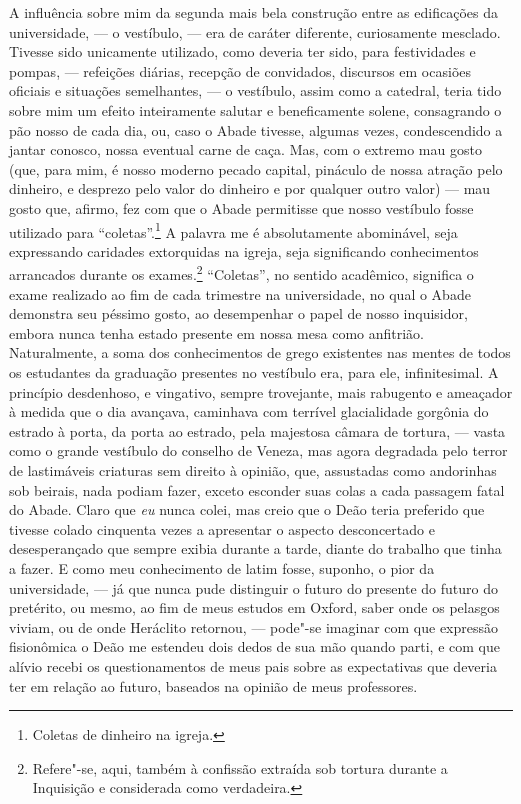A influência sobre mim da segunda mais bela construção entre as
edificações da universidade, --- o vestíbulo, --- era de caráter
diferente, curiosamente mesclado. Tivesse sido unicamente utilizado,
como deveria ter sido, para festividades e pompas, --- refeições diárias,
recepção de convidados, discursos em ocasiões oficiais e situações
semelhantes, --- o vestíbulo, assim como a catedral, teria tido sobre mim
um efeito inteiramente salutar e beneficamente solene, consagrando o pão
nosso de cada dia, ou, caso o Abade tivesse, algumas vezes,
condescendido a jantar conosco, nossa eventual carne de caça. Mas, com o
extremo mau gosto (que, para mim, é nosso moderno pecado capital,
pináculo de nossa atração pelo dinheiro, e desprezo pelo valor do
dinheiro e por qualquer outro valor) --- mau gosto que, afirmo, fez com
que o Abade permitisse que nosso vestíbulo fosse utilizado para
``coletas''.\footnote{Coletas de dinheiro na igreja.} A
palavra me é absolutamente abominável, seja expressando caridades
extorquidas na igreja, seja significando conhecimentos arrancados
durante os exames.\footnote{Refere"-se, aqui, também à confissão extraída
  sob tortura durante a Inquisição e considerada como verdadeira.} ``Coletas'', no sentido acadêmico, significa o exame
realizado ao fim de cada trimestre na universidade, no qual o Abade
demonstra seu péssimo gosto, ao desempenhar o papel de nosso inquisidor,
embora nunca tenha estado presente em nossa mesa como anfitrião.
Naturalmente, a soma dos conhecimentos de grego existentes nas mentes de
todos os estudantes da graduação presentes no vestíbulo era, para
ele, infinitesimal. A princípio desdenhoso, e vingativo, sempre
trovejante, mais rabugento e ameaçador à medida que o dia avançava,
caminhava com terrível glacialidade gorgônia do estrado à porta, da
porta ao estrado, pela majestosa câmara de tortura, --- vasta como o
grande vestíbulo do conselho de Veneza, mas agora degradada pelo terror
de lastimáveis criaturas sem direito à opinião, que, assustadas como
andorinhas sob beirais, nada podiam fazer, exceto esconder suas colas a
cada passagem fatal do Abade. Claro que \textit{eu} nunca colei, mas creio
que o Deão teria preferido que tivesse colado cinquenta vezes a
apresentar o aspecto desconcertado e desesperançado que sempre exibia
durante a tarde, diante do trabalho que tinha a fazer. E como meu
conhecimento de latim fosse, suponho, o pior da universidade, --- já que
nunca pude distinguir o futuro do presente do futuro do pretérito, ou
mesmo, ao fim de meus estudos em Oxford, saber onde os pelasgos viviam,
ou de onde Heráclito retornou, --- pode"-se imaginar com que expressão
fisionômica o Deão me estendeu dois dedos de sua mão quando parti, e com
que alívio recebi os questionamentos de meus pais sobre as expectativas
que deveria ter em relação ao futuro, baseados na opinião de meus
professores.

